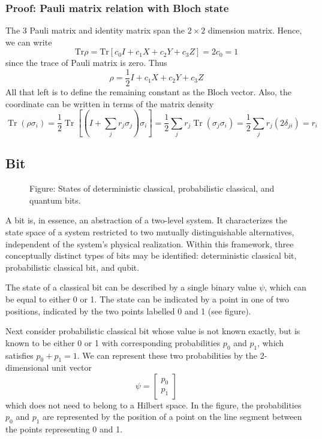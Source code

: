 \documentclass[../../../main.tex]{subfiles}
\begin{document}
\subsubsection{Proof: Pauli matrix relation with Bloch state}
The 3 Pauli matrix and identity matrix span the $2 \times 2$ dimension matrix.
Hence, we can write
\begin{equation*}
  \mathrm{Tr} \rho = \mathrm{Tr} [c_0I + c_1X+c_2Y+c_3Z] = 2c_0 = 1
\end{equation*}
since the trace of Pauli matrix is zero.
Thus
\begin{equation*}
  \rho = \frac{1 }{2 } I + c_1X+c_2Y+c_3Z
\end{equation*}
All that left is to define the remaining constant as the Bloch vector.
Also, the coordinate can be written in terms of the matrix density
\begin{equation*}
  \operatorname{Tr}(\rho\sigma_i)=\frac12\operatorname{Tr}\left[
\left(I+\sum_j r_j\sigma_j\right)\sigma_i
\right]=\frac12\sum_j r_j\operatorname{Tr}(\sigma_j\sigma_i)=\frac12\sum_j r_j(2\delta_{ji})=r_i
\end{equation*}

\subsection{Bit}
\begin{figure}[b]
  \centering
  \caption*{Figure: States of deterministic classical, probabilistic classical, and quantum bits.}
\end{figure}

A bit is, in essence, an abstraction of a two-level system.
It characterizes the state space of a system restricted to two mutually distinguishable alternatives, independent of the system’s physical realization.
Within this framework, three conceptually distinct types of bits may be identified: deterministic classical bit, probabilistic classical bit, and qubit.

The state of a classical bit can be described by a single binary value $\psi$, which can be equal to either 0 or 1.
The state can be indicated by a point in one of two positions, indicated by the two points labelled 0 and 1 (see figure).

Next consider probabilistic classical bit whose value is not known exactly, but is known to be either 0 or 1 with corresponding probabilities $p_0$ and $p_1$, which satisfies $p_0+p_1=1$.
We can represent these two probabilities by the 2-dimensional unit vector
\begin{equation*}
  \psi =
  \begin{bmatrix}
    p_0 \\p_1
  \end{bmatrix}
\end{equation*}
which does not need to belong to a Hilbert space.
In the figure, the probabilities $p_0$ and $p_1$ are represented by the position of a point on the line segment between the points representing 0 and 1.
\end{document}
